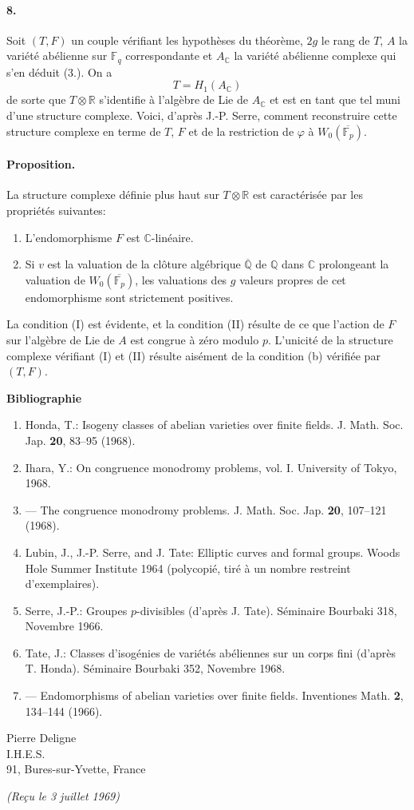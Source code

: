 \documentclass[10pt]{article}
\newcommand{\C}{\mathbb C}
\newcommand{\Fp}{\mathbb F_p}
\newcommand{\Fq}{\mathbb F_q}
\newcommand{\Q}{\mathbb Q}
\newcommand{\R}{\mathbb R}
\newcommand{\Ac}{A_{\C}}
\begin{document}
\paragraph{8.} Soit $(T,F)$ un couple vérifiant les hypothèses du théorème, $2g$ le rang de $T$, $A$ la variété abélienne sur $\Fq$ correspondante et $\Ac$ la variété abélienne complexe qui s'en déduit (3.). On a
\[
T=H_1(\Ac)
\]
de sorte que $T\otimes\R$ s'identifie à l'algèbre de Lie de $\Ac$ et est en tant que tel muni d'une structure complexe. Voici, d'après J.-P. Serre, comment reconstruire cette structure complexe en terme de $T$, $F$ et de la restriction de $\varphi$ à $W_0(\overline{\Fp})$.

\paragraph{Proposition.} La structure complexe définie plus haut sur $T\otimes\R$ est caractérisée par les propriétés suivantes:
\begin{enumerate}[label=(\Roman*)]
\item L'endomorphisme $F$ est $\C$-linéaire.
\item Si $v$ est la valuation de la clôture algébrique $\overline{\Q}$ de $\Q$ dans $\C$ prolongeant la valuation de $W_0(\overline{\Fp})$, les valuations des $g$ valeurs propres de cet endomorphisme sont strictement positives.
\end{enumerate}
La condition (I) est évidente, et la condition (II) résulte de ce que l'action de $F$ sur l'algèbre de Lie de $A$ est congrue à zéro modulo $p$. L'unicité de la structure complexe vérifiant (I) et (II) résulte aisément de la condition (b) vérifiée par $(T,F)$.

\begin{center}
\bfseries Bibliographie
\end{center}

\begin{enumerate}[label=\arabic*.,leftmargin=2.4em]
\item Honda, T.: Isogeny classes of abelian varieties over finite fields. J. Math. Soc. Jap. \textbf{20}, 83--95 (1968).
\item Ihara, Y.: On congruence monodromy problems, vol. I. University of Tokyo, 1968.
\item --- The congruence monodromy problems. J. Math. Soc. Jap. \textbf{20}, 107--121 (1968).
\item Lubin, J., J.-P. Serre, and J. Tate: Elliptic curves and formal groups. Woods Hole Summer Institute 1964 (polycopié, tiré à un nombre restreint d'exemplaires).
\item Serre, J.-P.: Groupes $p$-divisibles (d'après J. Tate). Séminaire Bourbaki 318, Novembre 1966.
\item Tate, J.: Classes d'isogénies de variétés abéliennes sur un corps fini (d'après T. Honda). Séminaire Bourbaki 352, Novembre 1968.
\item --- Endomorphisms of abelian varieties over finite fields. Inventiones Math. \textbf{2}, 134--144 (1966).
\end{enumerate}

\begin{flushright}
Pierre Deligne\\
I.H.E.S.\\
91, Bures-sur-Yvette, France
\end{flushright}

\begin{center}
\emph{(Reçu le 3 juillet 1969)}
\end{center}
\end{document}
